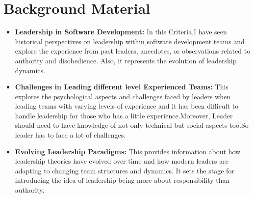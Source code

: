 \documentclass[a4paper,12pt]{report}
\begin{document}
\fontsize{14}{16}\selectfont \section{Background Material}
\fontsize{14}{20}\selectfont
\begin{itemize}
\item  \textbf{Leadership in Software Development:}
In this Criteria,I have seen historical perspectives on leadership within software development teams and explore the experience from past leaders, anecdotes, or observations related to authority and disobedience. Also, it represents the evolution of leadership dynamics.
\item  \textbf{Challenges in Leading different level Experienced Teams:}
This explores the psychological aspects and challenges faced by leaders when leading teams with varying levels of experience and it has been difficult to handle leadership for those who has a little experience.Moreover, Leader should need to have knowledge of not only technical but social aspects too.So leader has to face a lot of challenges.
\item  \textbf{Evolving Leadership Paradigms:}
 This provides information about how leadership theories have evolved over time and how modern leaders are adapting to changing team structures and dynamics. It sets the stage for introducing the idea of leadership being more about responsibility than authority.
\end{itemize}
\end{document}
